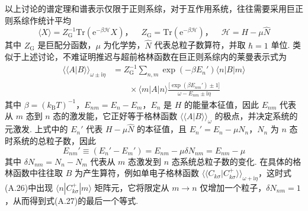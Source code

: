 以上讨论的谱定理和谱表示仅限于正则系综，对于互作用系统，往往需要采用巨正则系综作统计平均
\begin{equation}
\langle X\rangle=Z_{\mathrm{G}}^{-1}\mathrm{Tr}
(\mathrm{e}^{-\beta\mathscr{H}}X)\text{，}\quad
Z_{\mathrm{G}}=\mathrm{Tr}(\mathrm{e}^{-\beta\mathscr{H}})
\text{，}\quad\mathscr{H}=H-\mu\hat{N}
\end{equation}
其中 $Z_{\mathrm{G}}$ 是巨配分函数，$\mu$ 为化学势，$\hat{N}$ 代表总粒子数算符，并取 $\hbar=1$ 单位. 类似于上述讨论，不难证明推迟与超前格林函数在巨正则系综内的莱曼表示式为
\begin{equation}
\begin{aligned}
\langle\langle A|B\rangle\rangle_{\omega\pm\mathrm{i}\eta}
&=Z_{\mathrm{G}}^{-1}\sum_{n,m}\exp(-\beta E_{n}')
\langle n|B|m\rangle\\
&\qquad\times\langle m|A|n\rangle
\frac{\bigl[\exp(\beta E_{nm}')\pm1\bigr]}
{\omega-E_{nm}\pm\mathrm{i}\eta}
\end{aligned}
\end{equation}
其中 $\beta=(k_{\mathrm{B}}T)^{-1}$，$E_{nm}=E_{n}-E_{m}$，$E_{n}$ 是 $H$ 的能量本征值，因此 $E_{nm}$ 代表从 $m$ 态到 $n$ 态的激发能，它正好等于格林函数 $\langle\langle A|B\rangle\rangle_{\omega}$ 的极点，并决定系统的元激发. 上式中的 $E_{n}'$ 代表 $H-\mu\hat{N}$ 的本征值，且 $E_{n}'=E_{n}-\mu N_{n}$，$N_{n}$ 为 $n$ 态时系统的总粒子数，因此
\begin{equation}
E_{nm}'\equiv(E_{n}'-E_{m}')=E_{nm}-\mu\delta N_{nm}=E_{nm}-\mu
\end{equation}
其中 $\delta N_{nm}=N_{n}-N_{m}$ 代表从 $m$ 态激发到 $n$ 态系统总粒子数的变化. 在具体的格林函数中往往取 $B$ 为产生算符，例如单电子格林函数 $\langle\langle C_{k\sigma}|C_{k\sigma}^{+}\rangle\rangle_{\omega+\mathrm{i}\eta}$，这时式(A.26)中出现 $\langle n|C_{k\sigma}^{+}|m\rangle$ 矩阵元，它将限定从 $m\to n$ 仅增加一个粒子，$\delta N_{nm}=1$，从而得到式(A.27)的最后一个等式.

